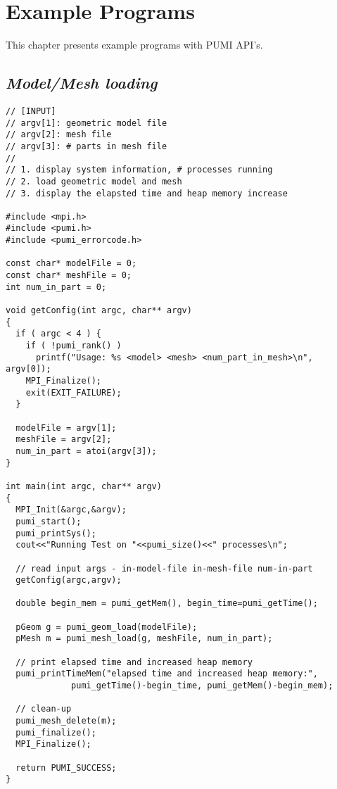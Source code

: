 \section{Example Programs}

This chapter presents example programs with PUMI API's.

\subsection{\textit{Model/Mesh loading}}

\begin{small}
\begin{verbatim}
// [INPUT]
// argv[1]: geometric model file
// argv[2]: mesh file
// argv[3]: # parts in mesh file
//
// 1. display system information, # processes running
// 2. load geometric model and mesh 
// 3. display the elapsted time and heap memory increase

#include <mpi.h>
#include <pumi.h>
#include <pumi_errorcode.h>

const char* modelFile = 0;
const char* meshFile = 0;
int num_in_part = 0;

void getConfig(int argc, char** argv)
{
  if ( argc < 4 ) {
    if ( !pumi_rank() )
      printf("Usage: %s <model> <mesh> <num_part_in_mesh>\n", argv[0]);
    MPI_Finalize();
    exit(EXIT_FAILURE);
  }

  modelFile = argv[1];
  meshFile = argv[2];
  num_in_part = atoi(argv[3]);
}

int main(int argc, char** argv)
{
  MPI_Init(&argc,&argv);
  pumi_start();
  pumi_printSys();
  cout<<"Running Test on "<<pumi_size()<<" processes\n";

  // read input args - in-model-file in-mesh-file num-in-part
  getConfig(argc,argv);

  double begin_mem = pumi_getMem(), begin_time=pumi_getTime();

  pGeom g = pumi_geom_load(modelFile);
  pMesh m = pumi_mesh_load(g, meshFile, num_in_part); 

  // print elapsed time and increased heap memory
  pumi_printTimeMem("elapsed time and increased heap memory:", 
             pumi_getTime()-begin_time, pumi_getMem()-begin_mem);

  // clean-up
  pumi_mesh_delete(m);
  pumi_finalize();
  MPI_Finalize();
  
  return PUMI_SUCCESS;
}
\end{verbatim}
\end{small}

